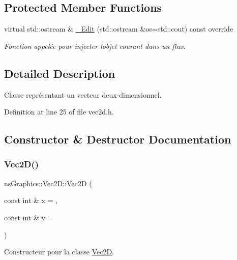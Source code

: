 \subsection*{Protected Member Functions}
\begin{DoxyCompactItemize}
\item 
virtual std\+::ostream \& \hyperlink{classns_graphics_1_1_vec2_d_ac271e47658195475bfe8b39f163dcebd}{\+\_\+\+Edit} (std\+::ostream \&os=std\+::cout) const override
\begin{DoxyCompactList}\small\item\em Fonction appelée pour injecter l\textquotesingle{}objet courant dans un flux. \end{DoxyCompactList}\end{DoxyCompactItemize}


\subsection{Detailed Description}
Classe représentant un vecteur deux-\/dimensionnel. 

Definition at line 25 of file vec2d.\+h.



\subsection{Constructor \& Destructor Documentation}
\mbox{\label{classns_graphics_1_1_vec2_d_a4a2fdd532ded3c29b7a3bd6e5a23fadf}} 
\subsubsection{\texorpdfstring{Vec2\+D()}{Vec2D()}\hspace{0.1cm}{\footnotesize\ttfamily [1/2]}}
{\footnotesize\ttfamily ns\+Graphics\+::\+Vec2\+D\+::\+Vec2D (\begin{DoxyParamCaption}\item[{const int \&}]{x = {},  }\item[{const int \&}]{y = {} }\end{DoxyParamCaption})}



Constructeur pour la classe \hyperlink{classns_graphics_1_1_vec2_d}{Vec2D}. 


